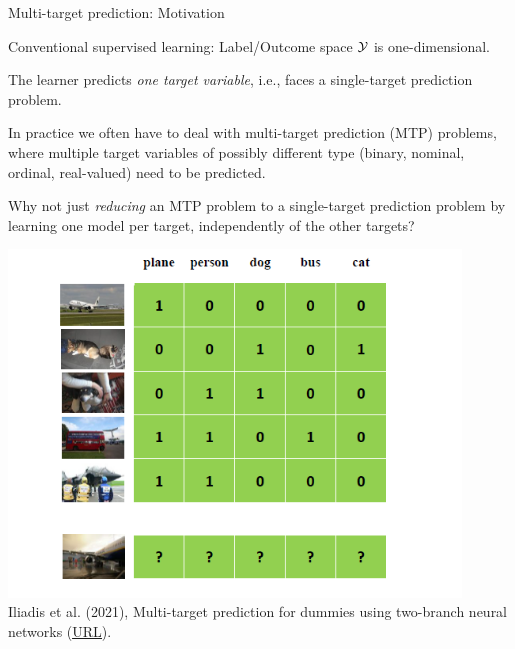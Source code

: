 \begin{vbframe}{Multi-target prediction: Motivation}
\scriptsize{
  \begin{itemize}
%  	
%		    
			\item Conventional supervised learning: Label/Outcome space $\mathcal{Y}$ is one-dimensional.
%			
			\item[$\leadsto$] The learner predicts \emph{one target variable}, i.e., faces a single-target prediction problem. 

		\begin{minipage}{0.45\textwidth}    

%
		    \item In practice we often have to deal with multi-target prediction (MTP) problems, where multiple target variables of possibly different type (binary, nominal, ordinal, real-valued) need to be predicted.
			\item Why not just \emph{reducing} an MTP problem to a single-target prediction problem by learning one model per target, independently of the other targets? 
		\end{minipage}
		\begin{minipage}{0.45\textwidth}    
			\begin{center}
				\includegraphics[width=0.9\textwidth]{figure/image_annotation} 		\tiny
				\\ Iliadis et al. (2021), Multi-target prediction for dummies using
				two-branch neural networks (\href{https://arxiv.org/abs/2104.09967}{\underline{URL}}).
			\end{center}
		\end{minipage}


\end{itemize}}
\end{vbframe}
